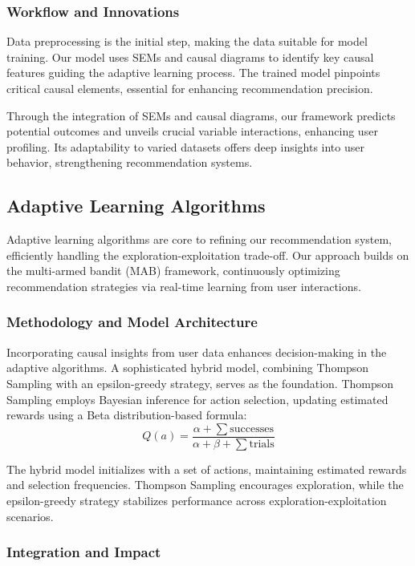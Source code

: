 \documentclass{article} %
\begin{document}
\subsubsection{Workflow and Innovations}

Data preprocessing is the initial step, making the data suitable for model training. Our model uses SEMs and causal diagrams to identify key causal features guiding the adaptive learning process. The trained model pinpoints critical causal elements, essential for enhancing recommendation precision.

Through the integration of SEMs and causal diagrams, our framework predicts potential outcomes and unveils crucial variable interactions, enhancing user profiling. Its adaptability to varied datasets offers deep insights into user behavior, strengthening recommendation systems.

\subsection{Adaptive Learning Algorithms}

Adaptive learning algorithms are core to refining our recommendation system, efficiently handling the exploration-exploitation trade-off. Our approach builds on the multi-armed bandit (MAB) framework, continuously optimizing recommendation strategies via real-time learning from user interactions.

\subsubsection{Methodology and Model Architecture}

Incorporating causal insights from user data enhances decision-making in the adaptive algorithms. A sophisticated hybrid model, combining Thompson Sampling with an epsilon-greedy strategy, serves as the foundation. Thompson Sampling employs Bayesian inference for action selection, updating estimated rewards using a Beta distribution-based formula:
\[
Q(a) = \frac{\alpha + \sum \text{successes}}{\alpha + \beta + \sum \text{trials}}
\]

The hybrid model initializes with a set of actions, maintaining estimated rewards and selection frequencies. Thompson Sampling encourages exploration, while the epsilon-greedy strategy stabilizes performance across exploration-exploitation scenarios.

\subsubsection{Integration and Impact}
\end{document}
